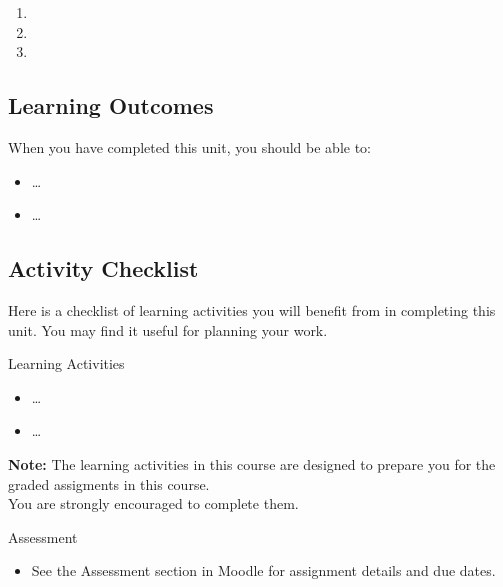 \documentclass[
]{book}
\providecommand{\tightlist}{%
  \setlength{\itemsep}{0pt}\setlength{\parskip}{0pt}}
\theoremstyle{definition}
\theoremstyle{definition}
\theoremstyle{definition}
\theoremstyle{definition}
\theoremstyle{remark}
\begin{document}
\begin{enumerate}
\def\labelenumi{\arabic{enumi}.}
\tightlist
\item
\item
\item
\end{enumerate}

\hypertarget{learning-outcomes-6}{%
\subsection*{Learning Outcomes}\label{learning-outcomes-6}}

When you have completed this unit, you should be able to:

\begin{itemize}
\tightlist
\item
  \ldots{}
\item
  \ldots{}
\end{itemize}

\hypertarget{activity-checklist-6}{%
\subsection*{Activity Checklist}\label{activity-checklist-6}}

Here is a checklist of learning activities you will benefit from in completing this unit. You may find it useful for planning your work.

\begin{reflect}
{Learning Activities}

\begin{itemize}
\tightlist
\item
  \ldots{}
\item
  \ldots{}
\end{itemize}

\textbf{Note:} The learning activities in this course are designed to prepare you for the graded assigments in this course.\\
You are strongly encouraged to complete them.
\end{reflect}

\begin{assessment}
{Assessment}

\begin{itemize}
\tightlist
\item
  See the Assessment section in Moodle for assignment details and due dates.
\end{itemize}
\end{assessment}
\end{document}
